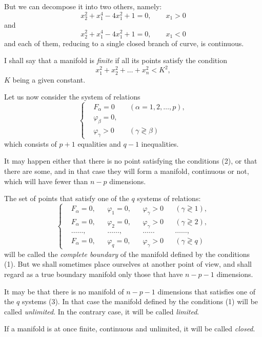 \documentclass{article}
\begin{document}
But we can decompose it into two others, namely:
\[
x^{2}_{2} + x^{4}_{1} - 4x^{2}_{1} + 1 = 0, \qquad x_{1} > 0
\]
and
\[
x^{2}_{2} + x^{4}_{1} - 4x^{2}_{1} + 1 = 0, \qquad x_{1} < 0
\]
and each of them, reducing to a single closed branch of curve, is continuous.

I shall say that a manifold is \emph{finite} if all its points satisfy the condition
\[
x^{2}_{1} + x^{2}_{2} + \ldots + x^{2}_{n} < K^{2},
\]
$K$ being a given constant.

Let us now consider the system of relations
\[
\left\{
\begin{aligned}
&F_{\alpha} = 0 &&(\alpha = 1, 2, \ldots, p),\\
&\varphi_{\beta} = 0,\\
&\varphi_{\gamma} > 0 &&(\gamma \gtrless \beta)
\end{aligned}
\right.
\tag{2}
\]
which consists of $p + 1$ equalities and $q - 1$ inequalities.

It may happen either that there is no point satisfying the conditions (2), or that there are some, and in that case they will form a manifold, continuous or not, which will have fewer than $n - p$ dimensions.

The set of points that satisfy one of the $q$ systems of relations:
\[
\left\{
\begin{aligned}
&F_{\alpha} = 0, &&\varphi_{1} = 0, &&\varphi_{\gamma} > 0 &&(\gamma \gtrless 1),\\
&F_{\alpha} = 0, &&\varphi_{2} = 0, &&\varphi_{\gamma} > 0 &&(\gamma \gtrless 2),\\
&\ldots\ldots, &&\ldots\ldots, &&\ldots\ldots &&\ldots\ldots,\\
&F_{\alpha} = 0, &&\varphi_{q} = 0, &&\varphi_{\gamma} > 0 &&(\gamma \gtrless q)
\end{aligned}
\right.
\tag{3}
\]
will be called the \emph{complete boundary} of the manifold defined by the conditions (1). But we shall sometimes place ourselves at another point of view, and shall regard as a true boundary manifold only those that have $n - p - 1$ dimensions.

It may be that there is no manifold of $n - p - 1$ dimensions that satisfies one of the $q$ systems (3). In that case the manifold defined by the conditions (1) will be called \emph{unlimited}. In the contrary case, it will be called \emph{limited}.

If a manifold is at once finite, continuous and unlimited, it will be called \emph{closed}.
\end{document}
